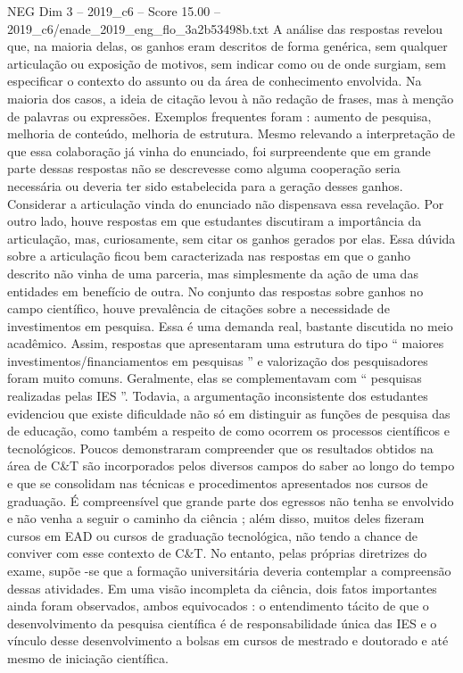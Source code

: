 \begin{textsample}{NEG Dim 3 – 2019\_c6 – Score 15.00 – 2019\_c6/enade\_2019\_eng\_flo\_3a2b53498b.txt}
A análise das respostas revelou que, na maioria delas, os ganhos eram descritos de forma genérica, sem qualquer articulação ou exposição de motivos, sem indicar como ou de onde surgiam, sem especificar o contexto do assunto ou da área de conhecimento envolvida.
Na maioria dos casos, a ideia de citação levou à não redação de frases, mas à menção de palavras ou expressões.
Exemplos frequentes foram : aumento de pesquisa, melhoria de conteúdo, melhoria de estrutura.
Mesmo relevando a interpretação de que essa colaboração já vinha do enunciado, foi surpreendente que em grande parte dessas respostas não se descrevesse como alguma cooperação seria necessária ou deveria ter sido estabelecida para a geração desses ganhos.
Considerar a articulação vinda do enunciado não dispensava essa revelação.
Por outro lado, houve respostas em que estudantes discutiram a importância da articulação, mas, curiosamente, sem citar os ganhos gerados por elas.
Essa dúvida sobre a articulação ficou bem caracterizada nas respostas em que o ganho descrito não vinha de uma parceria, mas simplesmente da ação de uma das entidades em benefício de outra.
No conjunto das respostas sobre ganhos no campo científico, houve prevalência de citações sobre a necessidade de investimentos em pesquisa.
Essa é uma demanda real, bastante discutida no meio acadêmico.
Assim, respostas que apresentaram uma estrutura do tipo “ maiores investimentos/financiamentos em pesquisas ” e valorização dos pesquisadores foram muito comuns.
Geralmente, elas se complementavam com “ pesquisas realizadas pelas IES ”.
Todavia, a argumentação inconsistente dos estudantes evidenciou que existe dificuldade não só em distinguir as funções de pesquisa das de educação, como também a respeito de como ocorrem os processos científicos e tecnológicos.
Poucos demonstraram compreender que os resultados obtidos na área de C\&T são incorporados pelos diversos campos do saber ao longo do tempo e que se consolidam nas técnicas e procedimentos apresentados nos cursos de graduação.
É compreensível que grande parte dos egressos não tenha se envolvido e não venha a seguir o caminho da ciência ; além disso, muitos deles fizeram cursos em EAD ou cursos de graduação tecnológica, não tendo a chance de conviver com esse contexto de C\&T.
No entanto, pelas próprias diretrizes do exame, supõe -se que a formação universitária deveria contemplar a compreensão dessas atividades.
Em uma visão incompleta da ciência, dois fatos importantes ainda foram observados, ambos equivocados : o entendimento tácito de que o desenvolvimento da pesquisa científica é de responsabilidade única das IES e o vínculo desse desenvolvimento a bolsas em cursos de mestrado e doutorado e até mesmo de iniciação científica.

\end{textsample}
